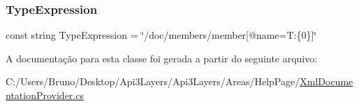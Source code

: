 \subsubsection{\texorpdfstring{Type\+Expression}{TypeExpression}}
{\footnotesize\ttfamily const string Type\+Expression = \char`\"{}/doc/members/member\mbox{[}@name=\textquotesingle{}T\+:\{0\}\textquotesingle{}\mbox{]}\char`\"{}\hspace{0.3cm}{\ttfamily [private]}}



A documentação para esta classe foi gerada a partir do seguinte arquivo\+:\begin{DoxyCompactItemize}
\item 
C\+:/\+Users/\+Bruno/\+Desktop/\+Api3\+Layers/\+Api3\+Layers/\+Areas/\+Help\+Page/\hyperlink{XmlDocumentationProvider_8cs}{Xml\+Documentation\+Provider.\+cs}\end{DoxyCompactItemize}
